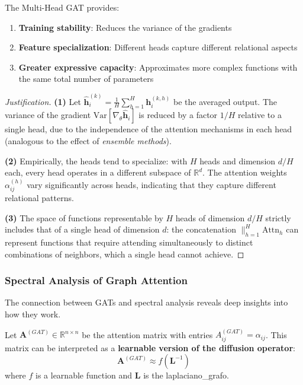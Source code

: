 \begin{proposition}\label{prop:multihead_gat_advantages}
The Multi-Head GAT provides:
\begin{enumerate}
    \item \textbf{Training stability}: Reduces the variance of the gradients
    \item \textbf{Feature specialization}: Different heads capture different relational aspects
    \item \textbf{Greater expressive capacity}: Approximates more complex functions with the same total number of parameters
\end{enumerate}
\end{proposition}

\begin{proof}[Justification]
\textbf{(1)} Let $\hat{\mathbf{h}}_i^{(k)} = \frac{1}{H}\sum_{h=1}^H \mathbf{h}_i^{(k,h)}$ be the averaged output. The variance of the gradient $\text{Var}[\nabla_\theta \hat{\mathbf{h}}_i]$ is reduced by a factor $1/H$ relative to a single head, due to the independence of the attention mechanisms in each head (analogous to the effect of \textit{ensemble methods}).

\textbf{(2)} Empirically, the heads tend to specialize: with $H$ heads and dimension $d/H$ each, every head operates in a different subspace of $\mathbb{R}^d$. The attention weights $\alpha_{ij}^{(h)}$ vary significantly across heads, indicating that they capture different relational patterns.

\textbf{(3)} The space of functions representable by $H$ heads of dimension $d/H$ strictly includes that of a single head of dimension $d$: the concatenation $\|_{h=1}^H \text{Attn}_h$ can represent functions that require attending simultaneously to distinct combinations of neighbors, which a single head cannot achieve.
\end{proof}

\subsubsection{Spectral Analysis of Graph Attention}\label{subsubsec:analisis_espectral_gat}

The connection between GATs and spectral analysis reveals deep insights into how they work.

\begin{definition}\label{def:spectral_interpretation_attention}
Let $\mathbf{A}^{(GAT)} \in \mathbb{R}^{n \times n}$ be the attention matrix with entries $A^{(GAT)}_{ij} = \alpha_{ij}$. This matrix can be interpreted as a \textbf{learnable version of the diffusion operator}:
\begin{equation}
    \mathbf{A}^{(GAT)} \approx f(\mathbf{L}^{-1})
    \label{eq:gat_spectral_approximation}
\end{equation}
where $f$ is a learnable function and $\mathbf{L}$ is the \gls{laplaciano_grafo}.
\end{definition}

